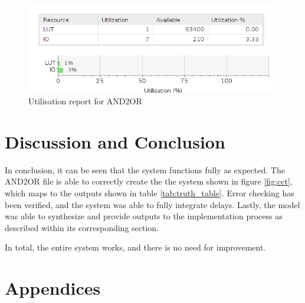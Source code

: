 \documentclass[12pt,a4paper]{article}
\begin{document}
\begin{figure}[H]
    \centering
    \includegraphics[scale=0.5]{images/utilization.png}
    \caption{Utilisation report for AND2OR}
    \label{fig:utilisation}
\end{figure}


\section{Discussion and Conclusion}

In conclusion, it can be seen that the system functions fully as expected. The AND2OR file is able to correctly create the the system shown in figure \ref{fig:cct}, which maps to the outputs shown in table \ref{tab:truth_table}. Error checking has been verified, and the system was able to fully integrate delays. Lastly, the model was able to synthesize and provide outputs to the implementation process as described within its corresponding section.

In total, the entire system works, and there is no need for improvement.

\section{Appendices}
\end{document}
